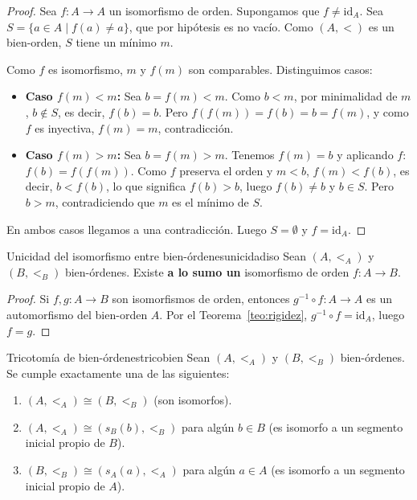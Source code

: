 \begin{proof}
Sea $f: A \to A$ un isomorfismo de orden. Supongamos que $f \neq \mathrm{id}_A$. Sea $S = \{a \in A \mid f(a) \neq a\}$, que por hipótesis es no vacío. Como $(A,<)$ es un bien-orden, $S$ tiene un mínimo $m$.

Como $f$ es isomorfismo, $m$ y $f(m)$ son comparables. Distinguimos casos:
\begin{itemize}[leftmargin=2em]
  \item \textbf{Caso $f(m) < m$:} Sea $b = f(m) < m$. Como $b < m$, por minimalidad de $m$, $b \notin S$, es decir, $f(b) = b$. Pero $f(f(m)) = f(b) = b = f(m)$, y como $f$ es inyectiva, $f(m) = m$, contradicción.
  \item \textbf{Caso $f(m) > m$:} Sea $b = f(m) > m$. Tenemos $f(m) = b$ y aplicando $f$: $f(b) = f(f(m))$. Como $f$ preserva el orden y $m < b$, $f(m) < f(b)$, es decir, $b < f(b)$, lo que significa $f(b) > b$, luego $f(b) \neq b$ y $b \in S$. Pero $b > m$, contradiciendo que $m$ es el mínimo de $S$.
\end{itemize}
En ambos casos llegamos a una contradicción. Luego $S = \emptyset$ y $f = \mathrm{id}_A$.
\end{proof}

\begin{teorema}{Unicidad del isomorfismo entre bien-órdenes}{unicidadiso}
Sean $(A, <_A)$ y $(B, <_B)$ bien-órdenes. Existe \textbf{a lo sumo un} isomorfismo de orden $f: A \to B$.
\end{teorema}

\begin{proof}
Si $f, g: A \to B$ son isomorfismos de orden, entonces $g^{-1} \circ f: A \to A$ es un automorfismo del bien-orden $A$. Por el Teorema~\ref{teo:rigidez}, $g^{-1} \circ f = \mathrm{id}_A$, luego $f = g$.
\end{proof}

\begin{teorema}{Tricotomía de bien-órdenes}{tricobien}
Sean $(A, <_A)$ y $(B, <_B)$ bien-órdenes. Se cumple exactamente una de las siguientes:
\begin{enumerate}[leftmargin=2em, label=(\roman*)]
  \item $(A, <_A) \cong (B, <_B)$ (son isomorfos).
  \item $(A, <_A) \cong (s_B(b), <_B)$ para algún $b \in B$ (es isomorfo a un segmento inicial propio de $B$).
  \item $(B, <_B) \cong (s_A(a), <_A)$ para algún $a \in A$ (es isomorfo a un segmento inicial propio de $A$).
\end{enumerate}
\end{teorema}

